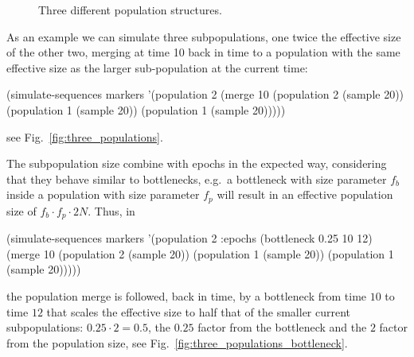 \documentclass{manual}
\begin{document}
\begin{empfile}
\begin{figure}[tb]
  \hspace*{.2cm}
  \hfill
  \hfill
  \hspace*{.2cm}

  \caption{Three different population structures.}
  \label{fig:population-structures}
\end{figure}
As an example we can simulate three subpopulations, one twice the
effective size of the other two, merging at time 10 back in time to a
population with the same effective size as the larger sub-population at
the current time:
\begin{code}
(simulate-sequences markers
   '(population 2 (merge 10 (population 2 (sample 20))
                            (population 1 (sample 20))
                            (population 1 (sample 20)))))
\end{code}
see Fig.~\ref{fig:three_populations}.

The subpopulation size combine with epochs in the expected way,
considering that they behave similar to bottlenecks, e.g.\ a
bottleneck with size parameter $f_b$ inside a population with size
parameter $f_p$ will result in an effective population size of
$f_b\cdot{}f_p\cdot{}2N$.  Thus, in 
\begin{code}
(simulate-sequences markers
   '(population 2 :epochs (bottleneck 0.25 10 12)
                (merge 10 (population 2 (sample 20))
                          (population 1 (sample 20))
                          (population 1 (sample 20)))))
\end{code}
the population merge is followed, back in time, by a bottleneck from
time $10$ to time $12$ that scales the effective size to half that of
the smaller current subpopulations: $0.25\cdot{}2=0.5$, the $0.25$
factor from the bottleneck and the $2$ factor from the population
size, see Fig.~\ref{fig:three_populations_bottleneck}.


\end{empfile}
\end{document}
